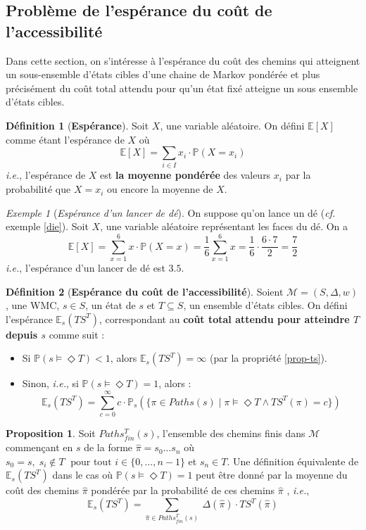 \documentclass[12pt,a4paper]{report}
\theoremstyle{definition}%
\newtheorem{definition}{Définition}[chapter]
\newtheorem{proposition}{Proposition}[chapter]
\theoremstyle{remark}
\newtheorem{example}{Exemple}[chapter]
\newcommand{\ie}{\textit{i.e.}, }
\newcommand{\cf}{\textit{cf.} }
\newcommand{\pr}{\mathbb{P}}
\let\labelitemi\labelitemii
\begin{document}
\subsection{Problème de l'espérance du coût de l'accessibilité}
Dans cette section, on s'intéresse à l'espérance du coût des chemins qui atteignent un sous-ensemble d'états cibles d'une chaine de Markov pondérée et plus précisément du coût total attendu pour qu'un état fixé atteigne un sous ensemble d'états cibles.
\begin{definition}[\textbf{Espérance}]
	Soit $X$, une variable aléatoire. On défini $\mathbb{E}[X]$ comme étant l'espérance de $X$ où 
	\[\mathbb{E}[X] = \sum_{i \in I}x_i \cdot \pr(X = x_i) \]
	\ie l'espérance de $X$ est \textbf{la moyenne pondérée} des valeurs $x_i$ par la probabilité que $X = x_i$ ou encore la moyenne de $X$.
	\cite{Course2}
\end{definition}
\begin{example}[\textit{Espérance d'un lancer de dé}]
	On suppose qu'on lance un dé (\cf exemple \ref{die}). Soit $X$, une variable aléatoire représentant les faces du dé. On a 
	\[ \mathbb{E}[X] = \sum_{x = 1}^6 x \cdot \pr(X = x)  = \frac{1}{6} \sum_{x = 1}^6 x = \frac{1}{6} \cdot \frac{6 \cdot 7}{2} = \frac{7}{2}\] \ie l'espérance d'un lancer de dé est $3.5$.
\end{example}

\begin{definition}[\textbf{Espérance du coût de l'accessibilité}]
	Soient $\mathcal{M} = (S, \Delta, w)$, une WMC, $s \in S$, un état de $s$ et $T \subseteq S$, un ensemble d'états cibles. On défini l'espérance $\mathbb{E}_s(TS^T)$, correspondant au \textbf{coût total attendu pour atteindre $T$ depuis $s$} comme suit :
	\begin{itemize}
	\renewcommand{\labelitemi}{\tiny$\bullet$}
	\item 	Si $\pr(s \models \Diamond T) < 1$, alors $\mathbb{E}_s(TS^T) = \infty$ (par la propriété \ref{prop-ts}).
	\item Sinon, \ie si $\pr(s \models \Diamond T) = 1$, alors :
	\[ \mathbb{E}_s(TS^T) = \sum_{c = 0}^\infty c \cdot \pr_s(\{\pi \in Paths(s) \; | \; \pi \models \Diamond T \wedge TS^T(\pi) = c \})\]
	\end{itemize}
\end{definition}

\begin{proposition}
			Soit $Paths_{fin}^T(s)$, l'ensemble des chemins finis dans $\mathcal{M}$ commençant en $s$ de la forme $\hat{\pi} = s_0 \dots s_n$ où $s_0 = s, \;  s_i \notin T \; \text{ pour tout } i \in \{0, \dots, n-1\}$ et $s_n \in T$. Une définition équivalente de $\mathbb{E}_s(TS^T)$ dans le cas où $\pr(s \models \Diamond T) = 1$ peut être donné par la moyenne du coût des chemins $\hat{\pi}$ pondérée par la probabilité de ces chemins $\hat{\pi}$ %
	, \ie
	\[\mathbb{E}_s(TS^T) = \sum_{\hat{\pi} \in Paths_{fin}^T(s)}\ \Delta(\hat{\pi}) \cdot TS^T(\hat{\pi})\]
\end{proposition}
\end{document}
